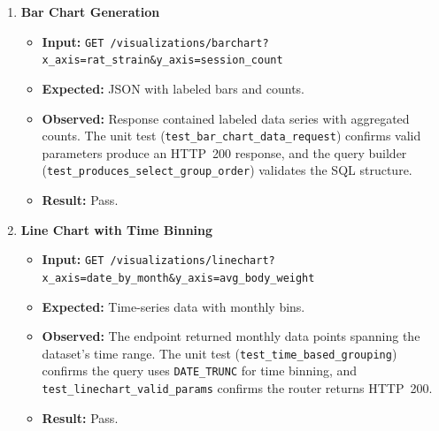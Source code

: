 \documentclass[12pt, titlepage]{article}
\begin{document}
\begin{enumerate}[label=\textbf{FR5-T\arabic*:}, leftmargin=*, labelsep=1em]
\sloppy

  \item \textbf{Bar Chart Generation}
  \begin{itemize}
    \item \textbf{Input:} \texttt{GET /visualizations/\allowbreak{}barchart?x\_\allowbreak{}axis=rat\_\allowbreak{}strain\&y\_\allowbreak{}axis=session\_\allowbreak{}count}
    \item \textbf{Expected:} JSON with labeled bars and counts.
    \item \textbf{Observed:} Response contained labeled data series with aggregated counts.
      The unit test (\texttt{test\_\allowbreak{}bar\_\allowbreak{}chart\_\allowbreak{}data\_\allowbreak{}request}) confirms valid parameters produce an HTTP~200
      response, and the query builder (\texttt{test\_\allowbreak{}produces\_\allowbreak{}select\_\allowbreak{}group\_\allowbreak{}order}) validates the SQL structure.
    \item \textbf{Result:} Pass.
  \end{itemize}

  \item \textbf{Line Chart with Time Binning}
  \begin{itemize}
    \item \textbf{Input:} \texttt{GET /visualizations/\allowbreak{}linechart?x\_\allowbreak{}axis=date\_\allowbreak{}by\_\allowbreak{}month\&y\_\allowbreak{}axis=avg\_\allowbreak{}body\_\allowbreak{}weight}
    \item \textbf{Expected:} Time-series data with monthly bins.
    \item \textbf{Observed:} The endpoint returned monthly data points spanning the dataset's time range.
      The unit test (\texttt{test\_\allowbreak{}time\_\allowbreak{}based\_\allowbreak{}grouping}) confirms the query uses \texttt{DATE\_\allowbreak{}TRUNC} for
      time binning, and \texttt{test\_\allowbreak{}linechart\_\allowbreak{}valid\_\allowbreak{}params} confirms the router returns HTTP~200.
    \item \textbf{Result:} Pass.
  \end{itemize}


\end{enumerate}
\end{document}
